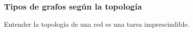 \documentclass[
10pt, %
aspectratio=169, %
]{beamer}
\begin{document}
	\begin{frame}
		
		\frametitle{Tipos de grafos según la topología}
		
		Entender la topología de una red es una tarea imprescindible. \\[4mm]
		
		\begin{itemize}
			
			\begin{minipage}{0.45\textwidth}
				
				
				

\end{minipage}
\end{itemize}
\end{frame}
\end{document}

